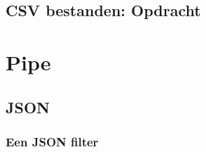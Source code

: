 \documentclass[a4paper,12pt,twoside,titlepage]{article}
\begin{document}
\subsection{CSV bestanden: Opdracht}



\section{Pipe}

\subsection{JSON}

\subsubsection{Een JSON filter}




\printindex
\end{document}

